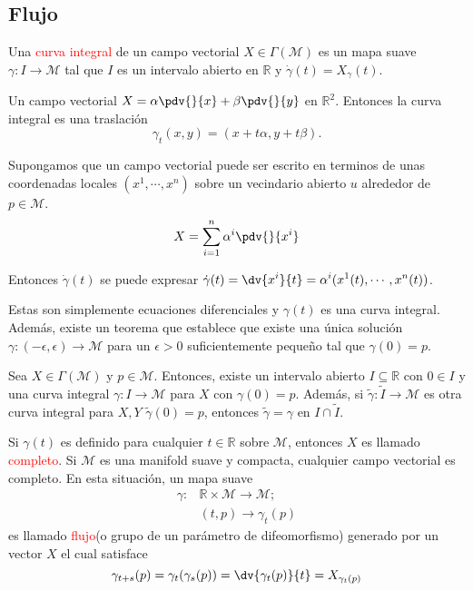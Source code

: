 \documentclass[../main]{subfiles}
\begin{document}
\subsection{Flujo}
Una \textcolor{red}{curva integral} de un campo vectorial $X \in \Gamma(\mathcal{M})$ es un mapa suave $\gamma: I\rightarrow \mathcal{M}$ tal que $I$ es un intervalo abierto en $\mathbb{R}$ y $\dot{\gamma}(t)=X_{\gamma}(t)$.

\ejemplo{} Un campo vectorial $\displaystyle X=\alpha \pdv{}{x}+\beta \pdv{}{y}$ en $\mathbb{R}^2$. Entonces la curva integral es una traslación
\begin{equation}
    \gamma_t(x, y)=(x+t\alpha, y+t\beta).
\end{equation}

Supongamos que un campo vectorial puede ser escrito en terminos de unas coordenadas locales $(x^1, \cdots, x^n)$ sobre un vecindario abierto $u$ alrededor de $p \in \mathcal{M}$.
\begin{equation}
    X=\sum_{i=1}^n \alpha^{i} \pdv{}{x^{i}}
\end{equation}

Entonces $\dot{\gamma}(t)$ se puede expresar $\displaystyle \dot{\gamma}(t)=\dv{x^{i}}{t}=\alpha^{i}(x^1(t), \cdots, x^n(t))$.

Estas son simplemente ecuaciones diferenciales y $\gamma(t)$ es una curva integral. Además, existe un teorema que establece que existe una única solución $\gamma:(-\epsilon, \epsilon) \rightarrow \mathcal{M}$ para un $\epsilon>0$ suficientemente pequeño tal que $\gamma(0)=p$.

 Sea $X \in \Gamma(\mathcal{M})$ y $p \in \mathcal{M}$. Entonces, existe un intervalo abierto $I \subseteq \mathbb{R}$ con $0 \in I$ y una curva integral $\gamma: I \rightarrow \mathcal{M}$ para $X$ con $\gamma(0)=p$. Además, si $\tilde{\gamma}: \tilde{I} \rightarrow \mathcal{M}$ es otra curva integral para $X, Y$ $\tilde{\gamma}(0)=p$, entonces $\tilde{\gamma}=\gamma$ en $I \cap \tilde{I}$.

Si $\gamma(t)$ es definido para cualquier $t \in \mathbb{R}$ sobre $\mathcal{M}$, entonces $X$ es llamado \textcolor{red}{completo}. Si $\mathcal{M}$ es una manifold suave y compacta, cualquier campo vectorial es completo. En esta situación, un mapa suave 
\begin{equation}
    \begin{split}
        \gamma:&\mathbb{R} \times \mathcal{M} \rightarrow \mathcal{M}; \\
        &(t, p) \rightarrow \gamma_t(p)
    \end{split}
\end{equation}
es llamado \textcolor{red}{flujo}(o grupo de un parámetro de difeomorfismo) generado por un vector $X$ el cual satisface 
\begin{equation}
    \gamma_{t+s}(p)=\gamma_t(\gamma_s(p))=\dv{\gamma_t(p)}{t}=X_{\gamma_t(p)}
\end{equation}
\end{document}
